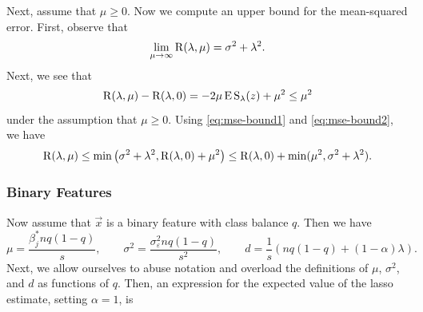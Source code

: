 Next, assume that \(\mu \geq 0\). Now we compute an upper bound for the mean-squared error. First, observe that
\begin{equation}
  \label{eq:mse-bound1}
  \lim_{\mu \rightarrow \infty} \operatorname{R}(\lambda, \mu) = \sigma^2 + \lambda^2.
\end{equation}
Next, we see that
\begin{equation}
  \label{eq:mse-bound2}
  \operatorname{R}(\lambda, \mu) - \operatorname{R}(\lambda, 0) = -2\mu \operatorname{E} \operatorname{S}_\lambda(z) + \mu^2 \leq \mu^2
\end{equation}
under the assumption that \(\mu \geq 0\). Using \eqref{eq:mse-bound1} and \eqref{eq:mse-bound2}, we have
\[
  \operatorname{R}(\lambda,\mu) \leq \min\big(\sigma^2 + \lambda^2, \operatorname{R}(\lambda, 0) + \mu^2\big) \leq \operatorname{R}(\lambda, 0) + \min(\mu^2, \sigma^2 + \lambda^2).
\]

\subsubsection{Binary Features}

Now assume that \(\vec{x}\) is a binary feature with class balance \(q\). Then we have
\[
  \mu = \frac{\beta^*_j nq(1 - q)}{s}, \qquad \sigma^2 = \frac{\sigma_\varepsilon^2nq(1 - q)}{s^2}, \qquad d = \frac{1}{s} \left(nq(1 -q) + (1-\alpha)\lambda\right).
\]
Next, we allow ourselves to abuse notation and overload the definitions of \(\mu\), \(\sigma^2\), and \(d\) as functions of \(q\). Then, an expression for the expected value of the lasso estimate, setting \(\alpha = 1\), is





